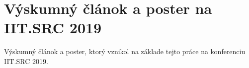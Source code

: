 \chapter{Výskumný článok a poster na IIT.SRC 2019 \label{cha:research_article}}

\setcounter{page}{1}

Výskumný článok a poster, ktorý vznikol na základe tejto práce na konferenciu IIT.SRC 2019.





\thispagestyle{empty}
\mbox{}
\newpage